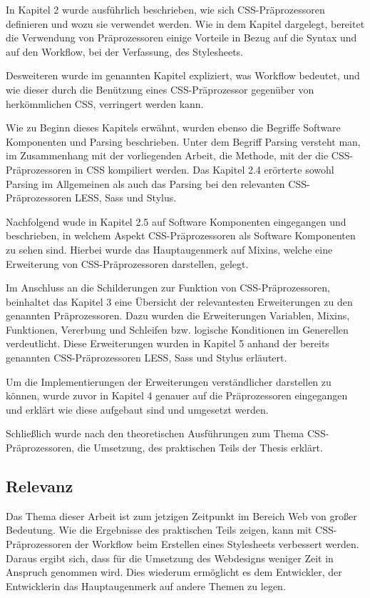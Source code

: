 In Kapitel 2 wurde ausführlich beschrieben, wie sich CSS-Präprozessoren definieren und wozu sie verwendet werden. Wie in dem Kapitel dargelegt, bereitet die Verwendung von Präprozessoren einige Vorteile in Bezug auf die Syntax und auf den Workflow, bei der Verfassung, des Stylesheets.

Desweiteren wurde im genannten Kapitel expliziert,  was Workflow bedeutet, und wie dieser durch die Benützung eines CSS-Präprozessor gegenüber von herkömmlichen CSS, verringert werden kann. 

Wie zu Beginn dieses Kapitels erwähnt, wurden ebenso die Begriffe \glqq{}Software Komponenten\grqq{} und \glqq{}Parsing\grqq{} beschrieben. \newline
Unter dem Begriff \glqq{}Parsing\grqq{} versteht man, im Zusammenhang mit der vorliegenden Arbeit,  die Methode, mit der die CSS-Präprozessoren in CSS kompiliert werden. \newline
Das Kapitel 2.4 erörterte sowohl Parsing im Allgemeinen als auch das Parsing bei den relevanten CSS-Präprozessoren \glqq{}LESS\grqq{}, \glqq{}Sass\grqq{} und \glqq{}Stylus\grqq{}.

Nachfolgend wude in Kapitel 2.5 auf Software Komponenten eingegangen und beschrieben, in welchem Aspekt CSS-Präprozessoren als Software Komponenten zu sehen sind. Hierbei wurde das Hauptaugenmerk auf Mixins, welche eine Erweiterung von CSS-Präprozessoren darstellen, gelegt.

Im Anschluss an die Schilderungen zur Funktion von CSS-Präprozessoren, beinhaltet das Kapitel 3 eine Übersicht der relevantesten Erweiterungen zu den genannten Präprozessoren. Dazu wurden die Erweiterungen Variablen, Mixins, Funktionen, Vererbung und Schleifen bzw. logische Konditionen im Generellen verdeutlicht.\newline
Diese Erweiterungen wurden in Kapitel 5 anhand der bereits genannten CSS-Präprozessoren \glqq{}LESS\grqq{}, \glqq{}Sass\grqq{} und \glqq{}Stylus\grqq{} erläutert.

Um die Implementierungen der Erweiterungen verständlicher darstellen zu können, wurde zuvor in Kapitel 4 genauer auf die Präprozessoren eingegangen und erklärt wie diese aufgebaut sind und umgesetzt werden.

Schließlich wurde nach den theoretischen Ausführungen zum Thema \glqq{}CSS-Präprozessoren\grqq{}, die Umsetzung, des praktischen Teils der Thesis erklärt. 

\subsection{Relevanz}
Das Thema dieser Arbeit ist zum jetzigen Zeitpunkt im Bereich Web von großer Bedeutung.\newline
Wie die Ergebnisse des praktischen Teils zeigen, kann mit CSS-Präprozessoren der Workflow beim Erstellen eines Stylesheets verbessert werden. Daraus ergibt sich, dass für die Umsetzung des Webdesigns weniger Zeit in Anspruch genommen wird. Dies wiederum ermöglicht es dem Entwickler, der Entwicklerin das Hauptaugenmerk auf andere Themen zu legen.

